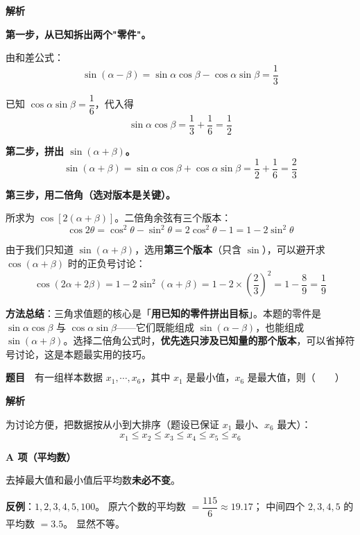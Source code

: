 \textbf{解析}

\textbf{第一步，从已知拆出两个"零件"。}

由和差公式：
\[\sin(\alpha-\beta)=\sin\alpha\cos\beta-\cos\alpha\sin\beta=\frac13\]

已知 $\cos\alpha\sin\beta=\dfrac16$，代入得
\[\sin\alpha\cos\beta=\frac13+\frac16=\frac12\]

\textbf{第二步，拼出 $\sin(\alpha+\beta)$。}
\[\sin(\alpha+\beta)=\sin\alpha\cos\beta+\cos\alpha\sin\beta=\frac12+\frac16=\frac23\]

\textbf{第三步，用二倍角（选对版本是关键）。}

所求为 $\cos\left[2(\alpha+\beta)\right]$。二倍角余弦有三个版本：
\[\cos2\theta=\cos^{2}\theta-\sin^{2}\theta=2\cos^{2}\theta-1=1-2\sin^{2}\theta\]

由于我们只知道 $\sin(\alpha+\beta)$，选用\textbf{第三个版本}（只含 $\sin$），可以避开求 $\cos(\alpha+\beta)$ 时的正负号讨论：
\[\cos(2\alpha+2\beta)=1-2\sin^{2}(\alpha+\beta)=1-2\times\left(\frac23\right)^{2}=1-\frac89=\frac19\]


\begin{gktip}
\textbf{方法总结}：三角求值题的核心是「\textbf{用已知的零件拼出目标}」。本题的零件是 $\sin\alpha\cos\beta$ 与 $\cos\alpha\sin\beta$——它们既能组成 $\sin(\alpha-\beta)$，也能组成 $\sin(\alpha+\beta)$。选择二倍角公式时，\textbf{优先选只涉及已知量的那个版本}，可以省掉符号讨论，这是本题最实用的技巧。
\end{gktip}

\par\medskip



\textbf{题目}　有一组样本数据 $x_1,\cdots,x_6$，其中 $x_1$ 是最小值，$x_6$ 是最大值，则（　　）

\textbf{解析}

为讨论方便，把数据按从小到大排序（题设已保证 $x_1$ 最小、$x_6$ 最大）：
\[x_1\le x_2\le x_3\le x_4\le x_5\le x_6\]

\par\medskip

\textbf{A 项（平均数）}

去掉最大值和最小值后平均数\textbf{未必不变}。

\textbf{反例}：$1,2,3,4,5,100$。
原六个数的平均数 $=\dfrac{115}6\approx19.17$；
中间四个 $2,3,4,5$ 的平均数 $=3.5$。
显然不等。

